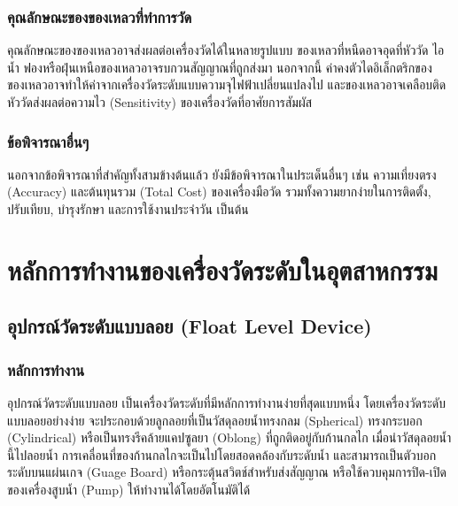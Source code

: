 \documentclass[final,11pt]{article}
\begin{document}
\subsubsection{คุณลักษณะของของเหลวที่ทำการวัด}
คุณลักษณะของของเหลวอาจส่งผลต่อเครื่องวัดได้ในหลายรูปแบบ ของเหลวที่หนืดอาจอุดที่หัววัด ไอน้ำ ฟองหรือฝุ่นเหนือของเหลวอาจรบกวนสัญญาณที่ถูกส่งมา 
นอกจากนี้ ค่าคงตัวไดอิเล็กตริกของของเหลวอาจทำให้ค่าจากเครื่องวัดระดับแบบความจุไฟฟ้าเปลี่ยนแปลงไป
และของเหลวอาจเคลือบติดหัววัดส่งผลต่อความไว (Sensitivity) ของเครื่องวัดที่อาศัยการสัมผัส 
\subsubsection{ข้อพิจารณาอื่นๆ} นอกจากข้อพิจารณาที่สำคัญทั้งสามข้างต้นแล้ว ยังมีข้อพิจารณาในประเด็นอื่นๆ เช่น 
ความเที่ยงตรง (Accuracy) และต้นทุนรวม (Total Cost) ของเครื่องมือวัด รวมทั้งความยากง่ายในการติดตั้ง, ปรับเทียบ, บำรุงรักษา 
และการใช้งานประจำวัน เป็นต้น

\newpage
\section{หลักการทำงานของเครื่องวัดระดับในอุตสาหกรรม}
\subsection{อุปกรณ์วัดระดับแบบลอย (Float Level Device)}
\subsubsection{หลักการทำงาน} 
อุปกรณ์วัดระดับแบบลอย เป็นเครื่องวัดระดับที่มีหลักการทำงานง่ายที่สุดแบบหนึ่ง
โดยเครื่องวัดระดับแบบลอยอย่างง่าย จะประกอบด้วยลูกลอยที่เป็นวัสดุลอยน้ำทรงกลม (Spherical) ทรงกระบอก (Cylindrical)
หรือเป็นทรงรีคล้ายแคปซูลยา (Oblong) ที่ถูกติดอยู่กับก้านกลไก เมื่อนำวัสดุลอยน้ำนี้ไปลอยน้ำ การเคลื่อนที่ของก้านกลไกจะเป็นไปโดยสอดคล้องกับระดับน้ำ
และสามารถเป็นตัวบอกระดับบนแผ่นเกจ (Guage Board) หรือกระตุ้นสวิตช์สำหรับส่งสัญญาณ หรือใช้ควบคุมการปิด-เปิดของเครื่องสูบน้ำ (Pump) ให้ทำงานได้โดยอัตโนมัติได้  
\end{document}
